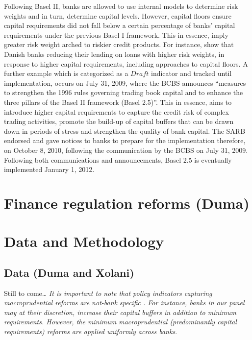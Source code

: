 \documentclass[
  letterpaper,
  DIV=11,
  numbers=noendperiod]{scrartcl}
\begin{document}
Following Basel II, banks are allowed to use internal models to
determine risk weights and in turn, determine capital levels. However,
capital floors ensure capital requirements did not fall below a certain
percentage of banks' capital requirements under the previous Basel I
framework\citep{basel06}. This in essence, imply greater risk weight
arched to riskier credit products. For instance,
\cite{imbierowicz2018time} show that Danish banks reducing their lending
on loans with higher risk weights, in response to higher capital
requirements, including approaches to capital floors. A further example
which is categorized as a \(Draft\) indicator and tracked until
implementation, occurs on July 31, 2009, where the BCBS announces
``measures to strengthen the 1996 rules governing trading book capital
and to enhance the three pillars of the Basel II framework (Basel
2.5)''. This in essence, aims to introduce higher capital requirements
to capture the credit risk of complex trading activities, promote the
build-up of capital buffers that can be drawn down in periods of stress
and strengthen the quality of bank capital\citep{basel09}. The SARB
endorsed and gave notices to banks to prepare for the implementation
therefore, on October 8, 2010, following the communication by the BCBS
on July 31, 2009. Following both communications and announcements, Basel
2.5 is eventually implemented January 1, 2012.

\section{Finance regulation reforms
(Duma)}\label{finance-regulation-reforms-duma}

\section{Data and Methodology}\label{data-and-methodology}

\subsection{Data (Duma and Xolani)}\label{data-duma-and-xolani}

Still to come\ldots{}
\textit{It is important to note that policy indicators capturing macroprudential reforms are not-bank specific . For instance, banks in our panel may at their discretion, increase their capital buffers in addition to minimum requirements. However, the minimum macroprudential (predominantly capital requirements) reforms are applied uniformly across banks}.
\end{document}
